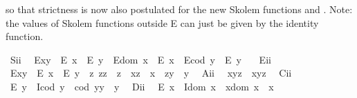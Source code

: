 \begin{isabellebody}
\begin{isamarkuptext}
 so that strictness is now also postulated for the new Skolem functions  
 and . Note: the values of Skolem functions outside E can just be given by 
the identity function.%
\end{isamarkuptext}\isamarkuptrue%
\ S\isactrlsub i\isactrlsub i{\isacharcolon}\ %
\ {\isachardoublequoteopen}{\isacharparenleft}E{\isacharparenleft}x{\isasymcdot}y{\isacharparenright}\ \isactrlbold {\isasymrightarrow}\ {\isacharparenleft}E\ x\ \isactrlbold {\isasymand}\ E\ y{\isacharparenright}{\isacharparenright}\ \isactrlbold {\isasymand}\ {\isacharparenleft}E{\isacharparenleft}dom\ x{\isacharparenright}\ \isactrlbold {\isasymrightarrow}\ E\ x{\isacharparenright}\ \isactrlbold {\isasymand}\ {\isacharparenleft}E{\isacharparenleft}cod\ y{\isacharparenright}\ \isactrlbold {\isasymrightarrow}\ E\ y{\isacharparenright}{\isachardoublequoteclose}\ \ \isanewline
\ E\isactrlsub i\isactrlsub i{\isacharcolon}\ %
\ {\isachardoublequoteopen}E{\isacharparenleft}x{\isasymcdot}y{\isacharparenright}\ \isactrlbold {\isasymleftarrow}\ {\isacharparenleft}E\ x\ \isactrlbold {\isasymand}\ E\ y\ \isactrlbold {\isasymand}\ {\isacharparenleft}\isactrlbold {\isasymexists}z{\isachardot}\ z{\isasymcdot}z\ {\isasymcong}\ z\ \isactrlbold {\isasymand}\ x{\isasymcdot}z\ {\isasymcong}\ x\ \isactrlbold {\isasymand}\ z{\isasymcdot}y\ {\isasymcong}\ y{\isacharparenright}{\isacharparenright}{\isachardoublequoteclose}\ \isanewline
\ A\isactrlsub i\isactrlsub i{\isacharcolon}\ %
\ {\isachardoublequoteopen}x{\isasymcdot}{\isacharparenleft}y{\isasymcdot}z{\isacharparenright}\ {\isasymcong}\ {\isacharparenleft}x{\isasymcdot}y{\isacharparenright}{\isasymcdot}z{\isachardoublequoteclose}\ \isanewline
\ C\isactrlsub i\isactrlsub i{\isacharcolon}\ %
\ {\isachardoublequoteopen}E\ y\ \isactrlbold {\isasymrightarrow}\ {\isacharparenleft}I{\isacharparenleft}cod\ y{\isacharparenright}\ \isactrlbold {\isasymand}\ {\isacharparenleft}cod\ y{\isacharparenright}{\isasymcdot}y\ {\isasymcong}\ y{\isacharparenright}{\isachardoublequoteclose}\ \isanewline
\ D\isactrlsub i\isactrlsub i{\isacharcolon}\ %
\ {\isachardoublequoteopen}E\ x\ \isactrlbold {\isasymrightarrow}\ {\isacharparenleft}I{\isacharparenleft}dom\ x{\isacharparenright}\ \isactrlbold {\isasymand}\ x{\isasymcdot}{\isacharparenleft}dom\ x{\isacharparenright}\ {\isasymcong}\ x{\isacharparenright}{\isachardoublequoteclose}%

\end{isabellebody}

